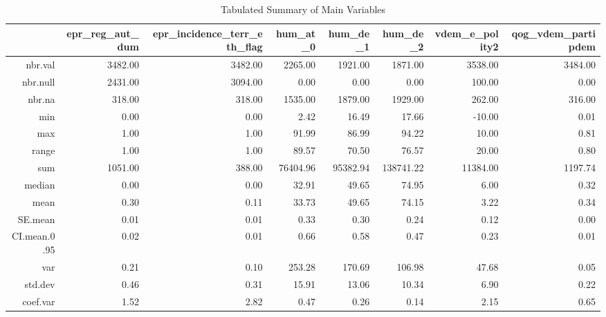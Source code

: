 \begin{table}[!htbp]
\centering
\begin{tabular}{rrrrrrrr}
  \hline
 & epr\_reg\_aut\_dum & epr\_incidence\_terr\_eth\_flag & hum\_at\_0 & hum\_de\_1 & hum\_de\_2 & vdem\_e\_polity2 & qog\_vdem\_partipdem \\ 
  \hline
nbr.val & 3482.00 & 3482.00 & 2265.00 & 1921.00 & 1871.00 & 3538.00 & 3484.00 \\ 
  nbr.null & 2431.00 & 3094.00 & 0.00 & 0.00 & 0.00 & 100.00 & 0.00 \\ 
  nbr.na & 318.00 & 318.00 & 1535.00 & 1879.00 & 1929.00 & 262.00 & 316.00 \\ 
  min & 0.00 & 0.00 & 2.42 & 16.49 & 17.66 & -10.00 & 0.01 \\ 
  max & 1.00 & 1.00 & 91.99 & 86.99 & 94.22 & 10.00 & 0.81 \\ 
  range & 1.00 & 1.00 & 89.57 & 70.50 & 76.57 & 20.00 & 0.80 \\ 
  sum & 1051.00 & 388.00 & 76404.96 & 95382.94 & 138741.22 & 11384.00 & 1197.74 \\ 
  median & 0.00 & 0.00 & 32.91 & 49.65 & 74.95 & 6.00 & 0.32 \\ 
  mean & 0.30 & 0.11 & 33.73 & 49.65 & 74.15 & 3.22 & 0.34 \\ 
  SE.mean & 0.01 & 0.01 & 0.33 & 0.30 & 0.24 & 0.12 & 0.00 \\ 
  CI.mean.0.95 & 0.02 & 0.01 & 0.66 & 0.58 & 0.47 & 0.23 & 0.01 \\ 
  var & 0.21 & 0.10 & 253.28 & 170.69 & 106.98 & 47.68 & 0.05 \\ 
  std.dev & 0.46 & 0.31 & 15.91 & 13.06 & 10.34 & 6.90 & 0.22 \\ 
  coef.var & 1.52 & 2.82 & 0.47 & 0.26 & 0.14 & 2.15 & 0.65 \\ 
   \hline
\end{tabular}
\caption{Tabulated Summary of Main Variables} 
\end{table}
